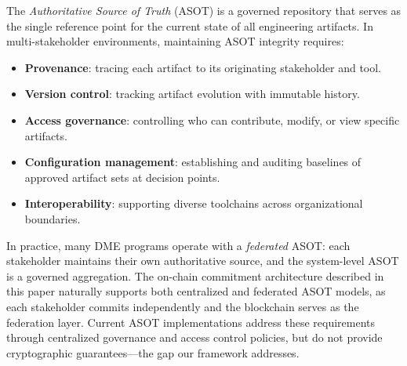 The \emph{Authoritative Source of Truth} (ASOT) is a governed repository that serves as the single reference point for the current state of all engineering artifacts.
In multi-stakeholder environments, maintaining ASOT integrity requires:
\begin{itemize}
    \item \textbf{Provenance}: tracing each artifact to its originating stakeholder and tool.
    \item \textbf{Version control}: tracking artifact evolution with immutable history.
    \item \textbf{Access governance}: controlling who can contribute, modify, or view specific artifacts.
    \item \textbf{Configuration management}: establishing and auditing baselines of approved artifact sets at decision points.
    \item \textbf{Interoperability}: supporting diverse toolchains across organizational boundaries.
\end{itemize}

In practice, many DME programs operate with a \emph{federated} ASOT: each stakeholder maintains their own authoritative source, and the system-level ASOT is a governed aggregation.
The on-chain commitment architecture described in this paper naturally supports both centralized and federated ASOT models, as each stakeholder commits independently and the blockchain serves as the federation layer.
Current ASOT implementations address these requirements through centralized governance and access control policies, but do not provide cryptographic guarantees---the gap our framework addresses.
